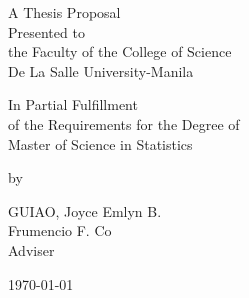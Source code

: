 %
%
%                 

\begin{titlepage}
\centering



\vspace{1.75cm}
A Thesis Proposal\\
Presented to\\
the Faculty of the College of Science\\
De La Salle University-Manila

\vspace{1.75cm}
In Partial Fulfillment\\
of the Requirements for the Degree of\\
Master of Science in Statistics

\vspace{1.75cm}
by\\
\vspace{1cm}

GUIAO, Joyce Emlyn B.  \\

\vspace{1.75cm}
Frumencio F. Co \\
Adviser

\vspace{1.75cm}
\today
\end{titlepage}
